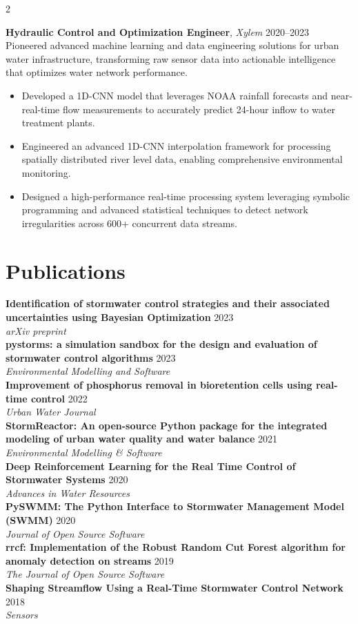 \documentclass{article}
\newcommand{\publication}[3]{
  \textbf{#1} \hfill \textcolor{tuftegray}{#2}\\
  {\small\textit{#3}}\\[0.5em]
}
\newcommand{\experience}[4]{
  \textbf{#1}, \textit{#2} \hfill \textcolor{tuftegray}{#3}\\
  #4
}
\begin{document}
\begin{paracol}{2}
\experience{Hydraulic Control and Optimization Engineer}{Xylem}{2020--2023}{
Pioneered advanced machine learning and data engineering solutions for urban water infrastructure, transforming raw sensor data into actionable intelligence that optimizes water network performance.
\begin{itemize}[leftmargin=*,itemsep=1mm]
  \item Developed a 1D-CNN model that leverages NOAA rainfall forecasts and near-real-time flow measurements to accurately predict 24-hour inflow to water treatment plants.
  \item Engineered an advanced 1D-CNN interpolation framework for processing spatially distributed river level data, enabling comprehensive environmental monitoring.
  \item Designed a high-performance real-time processing system leveraging symbolic programming and advanced statistical techniques to detect network irregularities across 600+ concurrent data streams.
\end{itemize}
}

\section{Publications}
\publication{Identification of stormwater control strategies and their associated uncertainties using Bayesian Optimization}{2023}{arXiv preprint}

\publication{pystorms: a simulation sandbox for the design and evaluation of stormwater control algorithms}{2023}{Environmental Modelling and Software}

\publication{Improvement of phosphorus removal in bioretention cells using real-time control}{2022}{Urban Water Journal}

\publication{StormReactor: An open-source Python package for the integrated modeling of urban water quality and water balance}{2021}{Environmental Modelling \& Software}

\publication{Deep Reinforcement Learning for the Real Time Control of Stormwater Systems}{2020}{Advances in Water Resources}

\publication{PySWMM: The Python Interface to Stormwater Management Model (SWMM)}{2020}{Journal of Open Source Software}

\publication{rrcf: Implementation of the Robust Random Cut Forest algorithm for anomaly detection on streams}{2019}{The Journal of Open Source Software}

\publication{Shaping Streamflow Using a Real-Time Stormwater Control Network}{2018}{Sensors}


\end{paracol}
\end{document}
